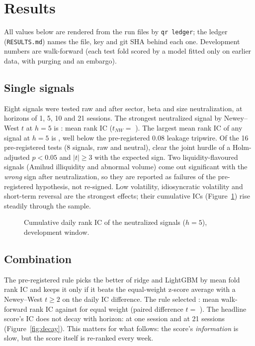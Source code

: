 \section{Results}\label{sec:results}
All values below are rendered from the run files by \texttt{qr ledger}; the ledger (\texttt{RESULTS.md}) names the file, key and git SHA behind
each one. Development numbers are walk-forward (each test fold scored by a model fitted only on earlier data, with purging and an embargo).

\subsection{Single signals}
Eight signals were tested raw and after sector, beta and size neutralization, at horizons of 1, 5, 10 and 21 sessions. The strongest
neutralized signal by Newey--West $t$ at $h=5$ is : mean rank IC  ($t_{NW}=$ ).
The largest mean rank IC of any signal at $h=5$ is , well below the pre-registered 0.08 leakage tripwire. Of the 16
pre-registered tests (8 signals, raw and neutral),  clear the joint hurdle of a Holm-adjusted $p<0.05$ and $|t|\ge3$ with
the expected sign. Two liquidity-flavoured signals (Amihud illiquidity and abnormal volume) come out significant with the \emph{wrong} sign
after neutralization, so they are reported as failures of the pre-registered hypothesis, not re-signed. Low volatility, idiosyncratic
volatility and short-term reversal are the strongest effects; their cumulative ICs (Figure~\ref{fig:cumic}) rise steadily through the sample.

\begin{figure}[h]\centering{}\caption{Cumulative daily rank IC of the neutralized signals ($h=5$), development window.}\label{fig:cumic}\end{figure}

\subsection{Combination}
The pre-registered rule picks the better of ridge and LightGBM by mean fold rank IC and keeps it only if it beats the equal-weight z-score
average with a Newey--West $t\ge2$ on the daily IC difference. The rule selected : mean walk-forward rank IC
 against  for equal weight (paired difference $t=$ ). The headline score's
IC does not decay with horizon:  at one session and  at 21 sessions (Figure~\ref{fig:decay}).
This matters for what follows: the score's \emph{information} is slow, but the score itself is re-ranked every week.

